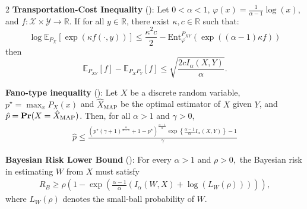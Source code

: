 \documentclass{article}
\numberwithin{theorem}{section}
\numberwithin{example}{section}
\numberwithin{remark}{section}
\numberwithin{definition}{section}
\newcommand{\E}{\mathbb{E}}
\def\Pr{{\rm \mathbf {Pr}}}
\newcommand{\X}{\mathcal{X}}
\newcommand{\Y}{\mathcal{Y}}
\begin{document}
\begin{table}[tbp]
{\begin{minipage}[t][60\baselineskip][t]{\textwidth}
\begin{multicols}{2}
\textbf{Transportation-Cost Inequality }():
Let $0<\alpha<1$, $\varphi(x)=\frac{1}{\alpha-1}\log(x)$, and $f:\X\times\Y\to\mathbb{R}$. If for all $y\in\mathbb{R}$, there exist $\kappa,c \in\mathbb{R}$ such that:
    \begin{equation*}
        \log\E_{P_X}[\exp(\kappa f(\cdot, y))] \leq \frac{\kappa^2 c}{2} - \text{Ent}^{P_{XY}}_\varphi(\exp((\alpha-1)\kappa f))
    \end{equation*}
    then
    \begin{equation*}
         \E_{P_{XY}}[f]-\E_{P_XP_Y}[f] \leq \sqrt{\frac{2cI_\alpha(X,Y)}{\alpha}}.
    \end{equation*}

\textbf{Fano-type inequality} (): Let $X$ be a discrete random variable, $p^\star = \max_x P_X(x)$ and $\hat{X}_{\mathrm{MAP}}$ be the optimal estimator of $X$ given $Y$, and $\hat{p}=\Pr(X = \hat{X}_{\mathrm{MAP}})$. Then, for all $\alpha >1$ and $\gamma >0$,
    \begin{equation*}
        \begin{split}
             \hat{p} \leq  \frac{\left(p^\star(\gamma+1)^{\frac{\alpha}{\alpha-1}}+ \!\! 1-p^\star\right)^{\frac{\alpha-1}{\alpha}} \!\! \exp \! \left \lbrace \frac{\alpha-1}{\alpha} I_\alpha(X,Y) \right\rbrace -1 }{\gamma}
        \end{split}
    \end{equation*} %
    
    \textbf{Bayesian Risk Lower Bound} 
 ():
For every $\alpha>1$ and $\rho>0,$ the Bayesian risk in estimating $W$ from $X$ must satisfy
	\begin{align*}
	R_B\geq \rho\left(1- \exp\left(\frac{\alpha-1}{\alpha}\left(I_\alpha(W,X) + \log(L_W(\rho))\right) \right)\right),
    \end{align*}
    where $L_W(\rho)$ denotes the small-ball probability of $W$. %
\vspace{\belowdisplayskip}
\vspace{\belowdisplayskip}

    

    \end{multicols}
  \end{minipage}
   }
\end{table}
\end{document}
